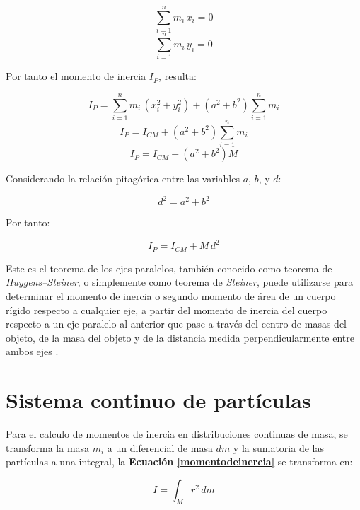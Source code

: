 \documentclass[letter,oneside,11pt]{article}
\begin{document}
\begin{equation*}
    \sum_{i=1}^{n} m_i\, x_i = 0
\end{equation*}
\begin{equation*}
    \sum_{i=1}^{n} m_i\, y_i = 0
\end{equation*}

Por tanto el momento de inercia $I_P$, resulta:

\begin{equation*}
    I_{P} = \sum_{i=1}^{n} m_i\, (x^2_i + y^2_i) + (a^2 + b^2) \sum_{i=1}^{n} m_i
\end{equation*}
\begin{equation*}
    I_{P} = I_{CM} + (a^2 + b^2) \sum_{i=1}^{n} m_i
\end{equation*}
\begin{equation*}
    I_{P} = I_{CM} + (a^2 + b^2) M
\end{equation*}

Considerando la relación pitagórica entre las variables $a$, $b$, y $d$:

\begin{equation*}
    d^2 = a^2 + b^2
\end{equation*}

Por tanto:

\begin{equation}
    I_{P} = I_{CM} + M\, d^2
\label{steiner}
\end{equation}

Este es el teorema de los ejes paralelos, también conocido como teorema de 
\emph{Huygens–Steiner}, o simplemente como teorema de \emph{Steiner}, puede
utilizarse para determinar el momento de inercia o segundo momento de área de
un cuerpo rígido respecto a cualquier eje, a partir del momento de inercia del
cuerpo respecto a un eje paralelo al anterior que pase a través del centro de
masas del objeto, de la masa del objeto y de la distancia medida
perpendicularmente entre ambos ejes \cite{WIKI1}.

\section{Sistema continuo de partículas \cite{Sears}}

Para el calculo de momentos de inercia en distribuciones continuas de masa, se
transforma la masa $m_i$ a un diferencial de masa $dm$ y la sumatoria de las
partículas a una integral, la \textbf{Ecuación \ref{momentodeinercia}} se
transforma en:

\begin{equation}
    I = \int_{M} r^2\, dm
\label{solidorigido}
\end{equation}
\end{document}
